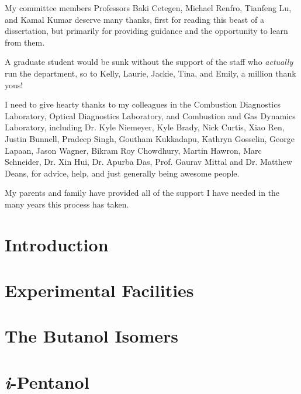 \documentclass[12pt,letterpaper,oneside,final]{book}
\begin{document}
My committee members Professors Baki Cetegen, Michael Renfro, Tianfeng
Lu, and Kamal Kumar deserve many thanks, first for reading this beast of
a dissertation, but primarily for providing guidance and the opportunity
to learn from them.

A graduate student would be sunk without the support of the staff who
\textit{actually} run the department, so to Kelly, Laurie, Jackie, Tina,
and Emily, a million thank yous!

I need to give hearty thanks to my colleagues in the Combustion Diagnostics
Laboratory, Optical Diagnostics Laboratory, and Combustion and Gas
Dynamics Laboratory, including Dr. Kyle Niemeyer, Kyle Brady, Nick Curtis, Xiao Ren, Justin
Bunnell, Pradeep Singh, Goutham Kukkadapu, Kathryn Gosselin, George Lapaan,
Jason Wagner, Bikram Roy Chowdhury, Martin Hawron, Marc Schneider, Dr. Xin Hui,
Dr. Apurba Das, Prof. Gaurav Mittal and Dr. Matthew Deans, for advice,
help, and just generally being awesome people.

My parents and family have provided all of the support I have needed in
the many years this process has taken.

\cleardoublepage
{}
\tableofcontents

\cleardoublepage
{}
\listoffigures

\cleardoublepage
{}
\listoftables

\cleardoublepage
\setcounter{page}{1}

\chapter{Introduction}
\label{chap:intro}

\cleardoublepage

\chapter{Experimental Facilities}
\label{chap:facilities}

\cleardoublepage

\chapter{The Butanol Isomers}
\label{chap:buoh}

\cleardoublepage

\chapter{\textit{i}-Pentanol}
\label{chap:peoh}

\cleardoublepage
\end{document}

